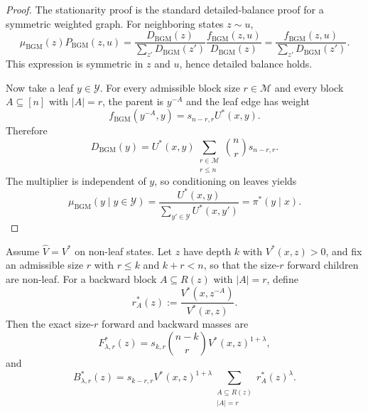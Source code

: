 \documentclass{article}
\numberwithin{theorem}{section}
\numberwithin{proposition}{section}
\numberwithin{corollary}{section}
\numberwithin{lemma}{section}
\numberwithin{conjecture}{section}
\numberwithin{remark}{section}
\numberwithin{definition}{section}
\numberwithin{assumption}{section}
\numberwithin{example}{section}
\newcommand{\calM}{{\mathcal{M}}}
\newcommand{\calY}{{\mathcal{Y}}}
\newcommand{\lbra}[1]{\left[#1\right]}
\newcommand{\abs}[1]{\left| #1\right|}
\begin{document}
\begin{proof}
The stationarity proof is the standard detailed-balance proof for a symmetric weighted graph. For neighboring states $z\sim u$,
\begin{equation*}
    \mu_{\mathrm{BGM}}(z)P_{\mathrm{BGM}}(z,u)
    =
    \frac{D_{\mathrm{BGM}}(z)}{\sum_{z'}D_{\mathrm{BGM}}(z')}
    \frac{f_{\mathrm{BGM}}(z,u)}{D_{\mathrm{BGM}}(z)}
    =
    \frac{f_{\mathrm{BGM}}(z,u)}{\sum_{z'}D_{\mathrm{BGM}}(z')}.
\end{equation*}
This expression is symmetric in $z$ and $u$, hence detailed balance holds.

Now take a leaf $y\in\calY$. For every admissible block size $r\in\calM$ and every block $A\subseteq\lbra{n}$ with $\abs{A}=r$, the parent is $y^{-A}$ and the leaf edge has weight
\begin{equation*}
    f_{\mathrm{BGM}}(y^{-A},y)=s_{n-r,r}U^*(x,y).
\end{equation*}
Therefore
\begin{equation*}
    D_{\mathrm{BGM}}(y)=U^*(x,y)\sum_{\substack{r\in\calM\\r\le n}}\binom{n}{r}s_{n-r,r}.
\end{equation*}
The multiplier is independent of $y$, so conditioning on leaves yields
\begin{equation*}
    \mu_{\mathrm{BGM}}(y\mid y\in\calY)=\frac{U^*(x,y)}{\sum_{y'\in\calY}U^*(x,y')}=\pi^*(y\mid x).
\end{equation*}
\end{proof}

\begin{proposition}
\label{prop:bg_mdm_directional_masses}
Assume $\widehat V=V^*$ on non-leaf states. Let $z$ have depth $k$ with $V^*(x,z)>0$, and fix an admissible size $r$ with $r\le k$ and $k+r<n$, so that the size-$r$ forward children are non-leaf. For a backward block $A\subseteq R(z)$ with $\abs{A}=r$, define
\begin{equation*}
    r_A^*(z):=\frac{V^*(x,z^{-A})}{V^*(x,z)}.
\end{equation*}
Then the exact size-$r$ forward and backward masses are
\begin{equation*}
    F_{\lambda,r}^*(z)=s_{k,r}\binom{n-k}{r}V^*(x,z)^{1+\lambda},
\end{equation*}
and
\begin{equation*}
    B_{\lambda,r}^*(z)=s_{k-r,r}V^*(x,z)^{1+\lambda}
    \sum_{\substack{A\subseteq R(z)\\\abs{A}=r}} r_A^*(z)^\lambda.
\end{equation*}
\end{proposition}
\end{document}
